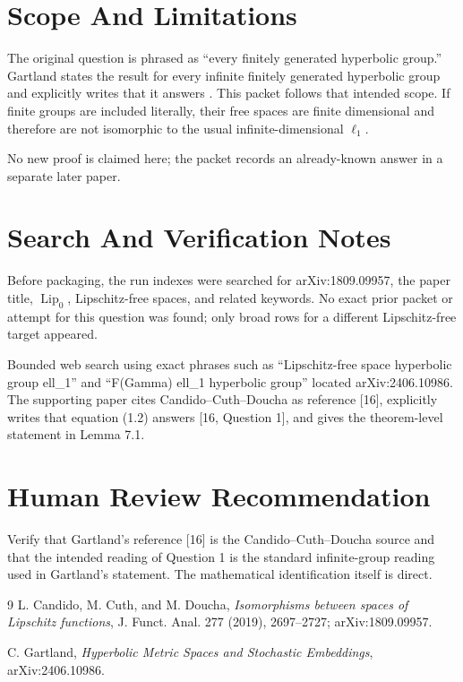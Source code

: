 \documentclass[11pt]{article}
\newcommand{\Lip}{\operatorname{Lip}}
\newcommand{\ellone}{\ell_1}
\begin{document}
\section*{Scope And Limitations}

The original question is phrased as ``every finitely generated hyperbolic
group.'' Gartland states the result for every infinite finitely generated
hyperbolic group and explicitly writes that it answers \cite[Question 1]{CCD}.
This packet follows that intended scope. If finite groups are included
literally, their free spaces are finite dimensional and therefore are not
isomorphic to the usual infinite-dimensional \(\ellone\).

No new proof is claimed here; the packet records an already-known answer in a
separate later paper.

\section*{Search And Verification Notes}

Before packaging, the run indexes were searched for arXiv:1809.09957, the
paper title, \(\Lip_0\), Lipschitz-free spaces, and related keywords. No exact
prior packet or attempt for this question was found; only broad rows for a
different Lipschitz-free target appeared.

Bounded web search using exact phrases such as ``Lipschitz-free space
hyperbolic group ell\_1'' and ``F(Gamma) ell\_1 hyperbolic group'' located
arXiv:2406.10986. The supporting paper cites Candido--Cuth--Doucha as
reference [16], explicitly writes that equation (1.2) answers [16, Question
1], and gives the theorem-level statement in Lemma 7.1.

\section*{Human Review Recommendation}

Verify that Gartland's reference [16] is the Candido--Cuth--Doucha source and
that the intended reading of Question 1 is the standard infinite-group reading
used in Gartland's statement. The mathematical identification itself is direct.

\begin{thebibliography}{9}
L. Candido, M. Cuth, and M. Doucha,
\emph{Isomorphisms between spaces of Lipschitz functions},
J. Funct. Anal. 277 (2019), 2697--2727; arXiv:1809.09957.

C. Gartland,
\emph{Hyperbolic Metric Spaces and Stochastic Embeddings},
arXiv:2406.10986.
\end{thebibliography}
\end{document}
